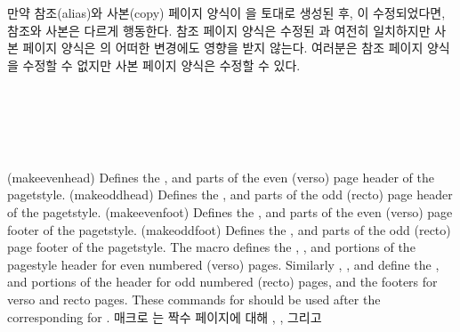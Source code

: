 만약 참조(alias)와 사본(copy) 페이지 양식이 을 토대로 생성된 후,
이 수정되었다면, 참조와 사본은 다르게 행동한다.
참조 페이지 양식은 수정된 과 여전히 일치하지만 사본 페이지
양식은 의 어떠한 변경에도 영향을 받지 않는다.
여러분은 참조 페이지 양식을 수정할 수 없지만 사본 페이지 양식은 수정할 수 있다.

\begin{syntax}
\cmd{\makeevenhead} \\
\cmd{\makeoddhead} \\
\cmd{\makeevenfoot} \\
\cmd{\makeoddfoot} \\
\end{syntax}
\glossary(makeevenhead)%
  {}%
  {Defines the ,  and  parts of the
   even (verso) page header of the  pagetstyle.}
\glossary(makeoddhead)%
  {}%
  {Defines the ,  and  parts of the
   odd (recto) page header of the  pagetstyle.}
\glossary(makeevenfoot)%
  {}%
  {Defines the ,  and  parts of the
   even (verso) page footer of the  pagetstyle.}
\glossary(makeoddfoot)%
  {}%
  {Defines the ,  and  parts of the
   odd (recto) page footer of the  pagetstyle.}
The macro \cmd{\makeevenhead} defines the , , and
 portions of the  pagestyle header 
for even numbered (verso) pages. 
Similarly \cmd{\makeoddhead}, \cmd{\makeevenfoot}, and
\cmd{\makeoddfoot} define the ,  and 
portions of the  header for odd numbered 
(recto) pages, and the footers for verso and recto pages. 
These commands for 
should be used after the corresponding \cmd{\makepagestyle} for .
매크로 \cmd{\makeevenhead}는 짝수 페이지에 대해 , ,
그리고 

